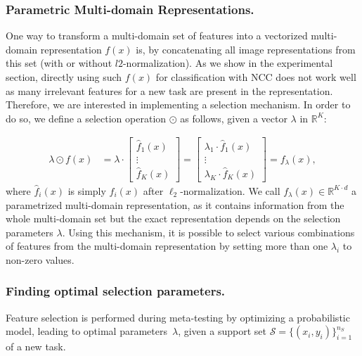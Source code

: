 \documentclass[runningheads]{llncs}
\newcommand\R{\mathbb{R}}
\begin{document}
\subsubsection{Parametric Multi-domain Representations.}
One way to transform a multi-domain set of features into a vectorized multi-domain
representation $f(x)$ is, by concatenating all image representations
from this set (with or without $l2$-normalization). As we show in the
experimental section, directly using such $f(x)$ for classification with NCC does not
work well as many irrelevant features for a new task are present in the representation. 
Therefore, we are interested in implementing a selection mechanism.
In order to do so, we define a selection operation $\odot$ as
follows, given a vector ${\lambda}$ in $\R^K$:

\begin{align}\label{eq:selected}
  {\lambda} \odot f(x) &= {\lambda} \cdot
        \begin{bmatrix}
          \hat{f}_{1}(x) \\
          \vdots \\
          \hat{f}_{K}(x)
        \end{bmatrix} = 
        \begin{bmatrix}
          \lambda_1 \cdot \hat{f}_{1}(x) \\
          \vdots \\
          \lambda_K \cdot \hat{f}_{K}(x)
        \end{bmatrix} = f_\lambda(x),
\end{align}
where $\hat{f}_i(x)$ is simply $f_i(x)$ after $\ell_2$-normalization.
We call $f_{\lambda}(x) \in \mathbb{R}^{K\cdot d}$ a parametrized multi-domain
representation, as it contains information from the whole multi-domain set but the
exact representation depends on the selection parameters ${\lambda}$.
Using this mechanism, it is possible
to select various combinations of features from the multi-domain representation by
setting more than one $\lambda_i$ to non-zero values.


\subsubsection{Finding optimal selection parameters.}
Feature selection is performed during meta-testing by optimizing a probabilistic model,
leading to optimal
parameters~${\lambda}$, given a support set $\mathcal{S}=\{(x_i,
y_i)\}_{i=1}^{n_S}$ of a new task.
\end{document}
